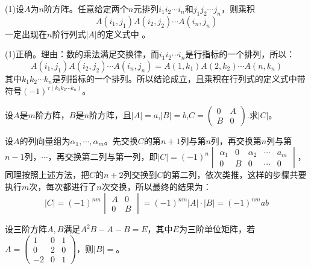 \documentclass[a4paper]{report}
\begin{document}
(1)设$A$为$n$阶方阵。任意给定两个$n$元排列$i_1i_2\cdots i_n$和$j_1j_2\cdots j_n$，则乘积
\begin{equation*}
A(i_1,j_1)A(i_2,j_2)\cdots A(i_n,j_n)
\end{equation*}
一定出现在$n$阶行列式$|A|$的定义式中 。

\begin{jie}
(1)正确。理由：数的乘法满足交换律，而$i_1i_2\cdots i_n$是行指标的一个排列，所以：
\begin{equation*}
A(i_1,j_1)A(i_2,j_2)\cdots A(i_n,j_n)=A(1,k_1)A(2,k_2)\cdots A(n,k_n)
\end{equation*}
其中$k_1k_2\cdots k_n$是列指标的一个排列。所以结论成立，且乘积在行列式的定义式中带符号$(-1)^{\tau(k_1k_2\cdots k_n)}$。
\end{jie}

\EX 设$A$是$m$阶方阵，$B$是$n$阶方阵，且$|A|=a$,$|B|=b$,$
C=
\begin{pmatrix}
0&A\\
B&0
\end{pmatrix}
$.求$|C|$。

\begin{jie}
设$A$的列向量组为$\alpha_1,\cdots,\alpha_m$。先交换$C$的第$n+1$列与第$n$列，再交换第$n$列与第$n-1$列，$\cdots$，再交换第二列与第一列，即$|C|=
(-1)^n
\begin{vmatrix}
\alpha_1&0&\alpha_2&\cdots&a_m\\
0&B&0&\cdots&0
\end{vmatrix}
$，同理按照上述方法，把$C$的$n+2$列交换到$C$的第二列，依次类推，这样的步骤共要执行$m$次，每次都进行了$n$次交换，所以最终的结果为：
\begin{equation*}
  |C|=(-1)^{nm}
  \begin{vmatrix}
   A&0\\
   0&B
  \end{vmatrix}=(-1)^{nm}|A|\cdot|B|=(-1)^{nm}ab
\end{equation*}
\end{jie}

\EX 设三阶方阵$A,B$满足$A^2B-A-B=E$，其中$E$为三阶单位矩阵，若$
A=
\begin{pmatrix}
1&0&1\\
0&2&0\\
-2&0&1
\end{pmatrix}
$，则$|B|=$\underline{\hphantom{~~~~~~~~~~}}。
\end{document}
